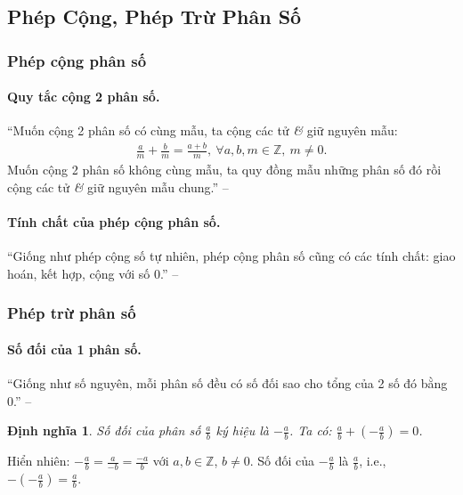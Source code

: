 \documentclass{article}
\numberwithin{equation}{section}
\newtheorem{dinhnghia}{Định nghĩa}[section]
\begin{document}

\subsection{Phép Cộng, Phép Trừ Phân Số}

\subsubsection{Phép cộng phân số}

\paragraph{Quy tắc cộng 2 phân số.} ``Muốn cộng 2 phân số có cùng mẫu, ta cộng các tử \textit{\&} giữ nguyên mẫu:
\begin{align*}
	\frac{a}{m} + \frac{b}{m} = \frac{a + b}{m},\ \forall a,b,m\in\mathbb{Z},\ m\ne 0.
\end{align*}
Muốn cộng 2 phân số không cùng mẫu, ta quy đồng mẫu những phân số đó rồi cộng các tử \textit{\&} giữ nguyên mẫu chung.'' -- \cite[pp. 34--35]{SGK_Toan_6_Canh_Dieu_tap_2}

\paragraph{Tính chất của phép cộng phân số.} ``Giống như phép cộng số tự nhiên, phép cộng phân số cũng có các tính chất: giao hoán, kết hợp, cộng với số 0.'' -- \cite[pp. 35]{SGK_Toan_6_Canh_Dieu_tap_2}

\subsubsection{Phép trừ phân số}

\paragraph{Số đối của 1 phân số.} ``Giống như số nguyên, mỗi phân số đều có số đối sao cho tổng của 2 số đó bằng 0.'' -- \cite[pp. 36]{SGK_Toan_6_Canh_Dieu_tap_2}

\begin{dinhnghia}
	\emph{Số đối} của phân số $\frac{a}{b}$ ký hiệu là $-\frac{a}{b}$. Ta có: $\frac{a}{b} + \left(-\frac{a}{b}\right) = 0$.
\end{dinhnghia}
Hiển nhiên: $-\frac{a}{b} = \frac{a}{-b} = \frac{-a}{b}$ với $a,b\in\mathbb{Z}$, $b\ne 0$. Số đối của $-\frac{a}{b}$ là $\frac{a}{b}$, i.e., $-\left(-\frac{a}{b}\right) = \frac{a}{b}$.
\end{document}
